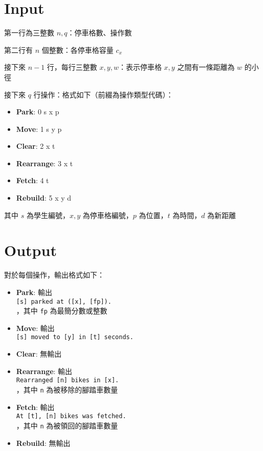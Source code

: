 \documentclass[11pt,a4paper]{article}
\begin{document}
\newpage
\section*{Input}

第一行為三整數 $n, q$：停車格數、操作數

第二行有 $n$ 個整數：各停車格容量 $c_x$

接下來 $n-1$ 行，每行三整數 $x, y, w$：表示停車格 $x, y$ 之間有一條距離為 $w$ 的小徑

接下來 $q$ 行操作：格式如下（前綴為操作類型代碼）：
\begin{itemize}
\item \textbf{Park}: 0 s x p
\item \textbf{Move}: 1 s y p
\item \textbf{Clear}: 2 x t
\item \textbf{Rearrange}: 3 x t
\item \textbf{Fetch}: 4 t
\item \textbf{Rebuild}: 5 x y d
\end{itemize}

其中 $s$ 為學生編號，$x, y$ 為停車格編號，$p$ 為位置，$t$ 為時間，$d$ 為新距離
\section*{Output}

對於每個操作，輸出格式如下：

\begin{itemize}
\item \textbf{Park}: 輸出 \\
	\texttt{[s] parked at ([x], [fp]).} \\
	，其中 \texttt{fp} 為最簡分數或整數
\item \textbf{Move}: 輸出 \\
	\texttt{[s] moved to [y] in [t] seconds.}
\item \textbf{Clear}: 無輸出
\item \textbf{Rearrange}: 輸出 \\
	\texttt{Rearranged [n] bikes in [x].} \\
	，其中 \texttt{n} 為被移除的腳踏車數量
\item \textbf{Fetch}: 輸出 \\ 
	\texttt{At [t], [n] bikes was fetched.} \\
	，其中 \texttt{n} 為被領回的腳踏車數量
\item \textbf{Rebuild}: 無輸出
\end{itemize}
\end{document}
